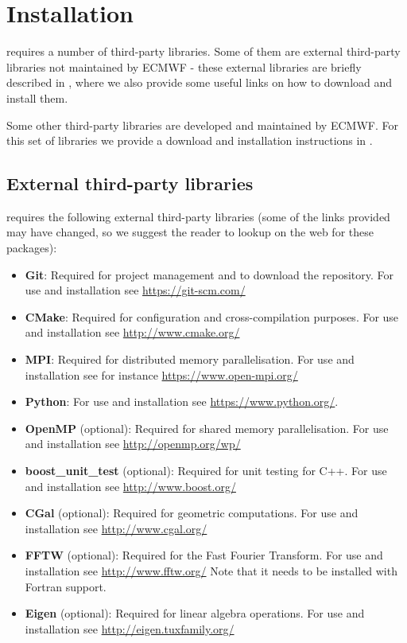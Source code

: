 \section{Installation}
\label{s:installation}
\Atlas requires a number of third-party libraries. 
Some of them are external third-party libraries not maintained 
by ECMWF - these external libraries are briefly described 
in , where we also provide some 
useful links on how to download and install them. 

Some other third-party libraries are developed and maintained 
by ECMWF. For this set of libraries we provide a download and 
installation instructions in .

\subsection{External third-party libraries}
\label{s:external-libs}
\Atlas requires the following external third-party libraries 
(some of the links provided may have changed, so we suggest 
the reader to lookup on the web for these packages):
%
\begin{itemize}
\item \textbf{Git}: Required for project management and to download 
the repository. For use and installation see \url{https://git-scm.com/}
\item \textbf{CMake}: Required for configuration and cross-compilation 
purposes. For use and installation see \url{http://www.cmake.org/}
\item \textbf{MPI}: Required for distributed memory parallelisation.
For use and installation see for instance \url{https://www.open-mpi.org/}
\item \textbf{Python}: For use and installation see \url{https://www.python.org/}.
\item \textbf{OpenMP} (optional): Required for shared memory 
parallelisation. For use and installation see \url{http://openmp.org/wp/}
\item \textbf{boost\_unit\_test} (optional): Required for unit testing 
for C++. For use and installation see \url{http://www.boost.org/}
\item \textbf{CGal} (optional): Required for geometric computations.
For use and installation see \url{http://www.cgal.org/} 
\item \textbf{FFTW} (optional): Required for the Fast Fourier Transform.
For use and installation see \url{http://www.fftw.org/} Note that it needs
to be installed with Fortran support.
\item \textbf{Eigen} (optional): Required for linear algebra operations.
For use and installation see \url{http://eigen.tuxfamily.org/}
\end{itemize}
